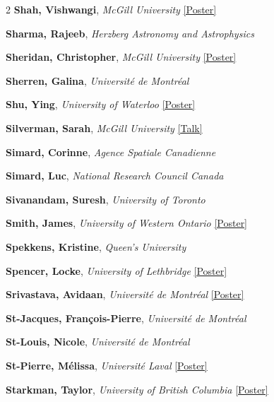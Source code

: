 \begin{small}
\begin{multicols}{2}
\textbf{Shah, Vishwangi}, {\footnotesize\textit{McGill University}} \hyperref[poster-abstract-page-talk-174]{\scriptsize\textcolor{cascateal}{[Poster]}}\par
\textbf{Sharma, Rajeeb}, {\footnotesize\textit{Herzberg Astronomy and Astrophysics}}\par
\textbf{Sheridan, Christopher}, {\footnotesize\textit{McGill University}} \hyperref[poster-abstract-page-talk-100]{\scriptsize\textcolor{cascateal}{[Poster]}}\par
\textbf{Sherren, Galina}, {\footnotesize\textit{Université de Montréal}}\par
\textbf{Shu, Ying}, {\footnotesize\textit{University of Waterloo}} \hyperref[poster-abstract-page-talk-91]{\scriptsize\textcolor{cascateal}{[Poster]}}\par
\textbf{Silverman, Sarah}, {\footnotesize\textit{McGill University}} \hyperref[abstract-page-talk-23]{\scriptsize\textcolor{cascablue}{[Talk]}}\par
\textbf{Simard, Corinne}, {\footnotesize\textit{Agence Spatiale Canadienne}}\par
\textbf{Simard, Luc}, {\footnotesize\textit{National Research Council Canada}}\par
\textbf{Sivanandam, Suresh}, {\footnotesize\textit{University of Toronto}}\par
\textbf{Smith, James}, {\footnotesize\textit{University of Western Ontario}} \hyperref[poster-abstract-page-talk-188]{\scriptsize\textcolor{cascateal}{[Poster]}}\par
\textbf{Spekkens, Kristine}, {\footnotesize\textit{Queen's University}}\par
\textbf{Spencer, Locke}, {\footnotesize\textit{University of Lethbridge}} \hyperref[poster-abstract-page-talk-267]{\scriptsize\textcolor{cascateal}{[Poster]}}\par
\textbf{Srivastava, Avidaan}, {\footnotesize\textit{Université de Montréal}} \hyperref[poster-abstract-page-talk-46]{\scriptsize\textcolor{cascateal}{[Poster]}}\par
\textbf{St-Jacques, François-Pierre}, {\footnotesize\textit{Université de Montréal}}\par
\textbf{St-Louis, Nicole}, {\footnotesize\textit{Université de Montréal}}\par
\textbf{St-Pierre, Mélissa}, {\footnotesize\textit{Université Laval}} \hyperref[poster-abstract-page-talk-15]{\scriptsize\textcolor{cascateal}{[Poster]}}\par
\textbf{Starkman, Taylor}, {\footnotesize\textit{University of British Columbia}} \hyperref[poster-abstract-page-talk-249]{\scriptsize\textcolor{cascateal}{[Poster]}}\par

\end{multicols}
\end{small}
